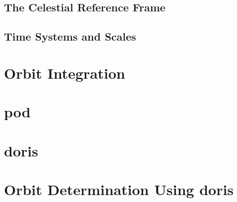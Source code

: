 \documentclass[12pt,a4paper,twoside]{report}
\begin{document}
    \section{The Celestial Reference Frame}\label{ssec:the-celestial-reference-frame}
      
      
      
      
    
    \section{Time Systems and Scales}\label{ssec:time-systems-and-scales}
      
      

\chapter{Orbit Integration}\label{ch:orbit-integration}
  
  
  
  
    

\chapter{\gls{pod}}\label{ch:pod}
  
    
  
    
    
  
  
  
  

\chapter{\gls{doris}}\label{ch:doris}
  
    
  
  
  
  
  
\chapter{Orbit Determination Using \gls{doris}}\label{ch:pod-using-doris}
  
  
  
  
\end{document}
